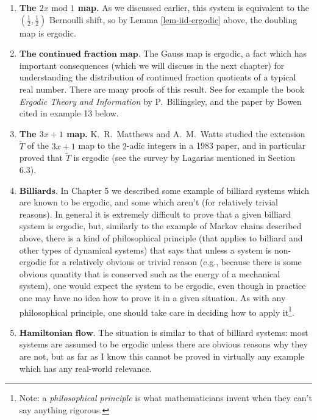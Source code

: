 \documentclass[11pt]{report}
\newcommand{\Z}{\mathbb{Z}}
\theoremstyle{plain}
\theoremstyle{definition}
\begin{document}
\begin{enumerate}[label=\arabic*.]
\begin{proof}
where we denote $d_n = c_n e^{2\pi in\alpha}$. Since $A$ is invariant, i.e., $\mathbf{1}_{R_\alpha^{-1}(A)}=\mathbf{1}_A$ a.s., we get that $c_n=d_n$ for all $n\in\Z$. But $\alpha$ is irrational, so $e^{2\pi in\alpha}\neq 1$ if $n\neq 0$. It follows that $c_n=0$ for all $n\neq 0$, which leaves only the constant Fourier coefficient, i.e., $\mathbf{1}_A \equiv c_0$ a.s., which proves that $A$ is a trivial event.
\end{proof}
\item \textbf{The $2x\textrm{ mod }1$ map.} As we discussed earlier, this system is equivalent to the $(\tfrac12,\tfrac12)$ Bernoulli shift, so by Lemma \ref{lem-iid-ergodic} above, the doubling map is ergodic.
\item $\textbf{The continued fraction map.}$ The Gauss map is ergodic, a fact which has important consequences (which we will discuss in the next chapter) for understanding the distribution of continued fraction quotients of a typical real number. There are many proofs of this result. See for example the book \emph{Ergodic Theory and Information} by P.\ Billingsley, and the paper by Bowen cited in example 13 below.
\item \textbf{The $3x+1$ map.} K.\ R.\ Matthews and A.\ M.\ Watts studied the extension $\tilde{T}$ of the $3x+1$ map to the $2$-adic integers in a 1983 paper, and in particular proved that $\tilde{T}$ is ergodic (see the survey by Lagarias mentioned in Section 6.3).
\item $\textbf{Billiards.}$ In Chapter 5 we described some example of billiard systems which are known to be ergodic, and some which aren't (for relatively trivial reasons). In general it is extremely difficult to prove that a given billiard system is ergodic, but, similarly to the example of Markov chains described above, there is a kind of philosophical principle (that applies to billiard and other types of dynamical systems) that says that unless a system is non-ergodic for a relatively obvious or trivial reason (e.g., because there is some obvious quantity that is conserved such as the energy of a mechanical system), one would expect the system to be ergodic, even though in practice one may have no idea how to prove it in a given situation. As with any philosophical principle, one should take care in deciding how to apply it\footnote{Note: a \emph{philosophical principle} is what mathematicians invent when they can't say anything rigorous.}.
\item $\textbf{Hamiltonian flow.}$ The situation is similar to that of billiard systems: most systems are assumed to be ergodic unless there are obvious reasons why they are not, but as far as I know this cannot be proved in virtually any example which has any real-world relevance.

\end{enumerate}
\end{document}

